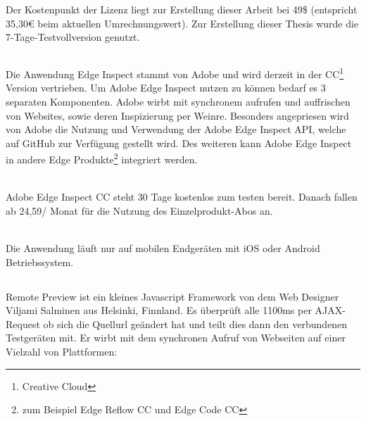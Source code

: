	Der Kostenpunkt der Lizenz liegt zur Erstellung dieser Arbeit bei 49\$ (entspricht 35,30€ beim aktuellen Umrechnungswert). Zur 	Erstellung dieser Thesis wurde die 7-Tage-Testvollversion genutzt.
	
	\subsection{}
	Die Anwendung Edge Inspect stammt von Adobe und wird derzeit in der CC\footnote{Creative Cloud} Version vertrieben. Um 		Adobe Edge Inspect nutzen zu können bedarf es 3 separaten Komponenten. Adobe wirbt mit synchronem aufrufen und 			auffrischen von Websites, sowie deren Inspizierung per Weinre. Besonders angepriesen wird von Adobe die Nutzung und 		Verwendung der Adobe Edge Inspect API, welche auf GitHub zur Verfügung gestellt wird. Des weiteren kann Adobe Edge 		Inspect in andere Edge Produkte\footnote{zum Beispiel Edge Reflow CC und Edge Code CC} integriert werden. 
	
	\\Adobe Edge Inspect CC steht 30 Tage kostenlos zum testen bereit. Danach fallen ab 24,59/ Monat für die Nutzung des 			Einzelprodukt-Abos an.
	
	\\Die Anwendung läuft nur auf mobilen Endgeräten mit iOS oder Android Betriebssystem.
	
	\subsection{}
	Remote Preview ist ein kleines Javascript Framework von dem Web Designer Viljami Salminen aus Helsinki, Finnland. Es 		überprüft alle 1100ms per AJAX-Request ob sich die Quellurl geändert hat und teilt dies dann den verbundenen Testgeräten mit. 	Er wirbt mit dem synchronen Aufruf von Webseiten auf einer Vielzahl von Plattformen: 
	
